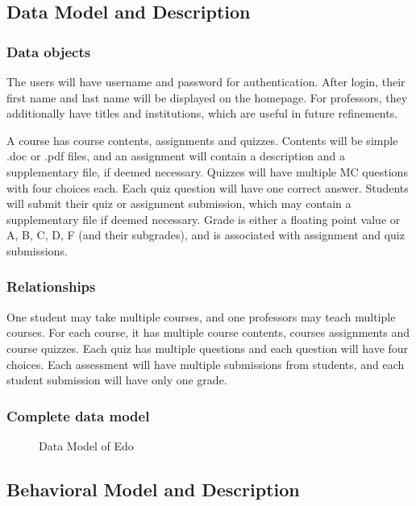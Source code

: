 \documentclass[paper=a4, fontsize=11pt]{scrartcl}
\numberwithin{equation}{section}		%
\numberwithin{figure}{section}			%
\numberwithin{table}{section}				%
\begin{document}
\subsection{Data Model and Description}

\subsubsection{Data objects}
The users will have username and password for authentication. After login, their first name and last name will be displayed on the homepage. For professors, they additionally have titles and institutions, which are useful in future refinements.

A course has course contents, assignments and quizzes. Contents will be simple .doc or .pdf files, and an assignment will contain a description and a supplementary file, if deemed necessary. Quizzes will have multiple MC questions with four choices each. Each quiz question will have one correct answer. Students will submit their quiz or assignment submission, which may contain a supplementary file if deemed necessary. Grade is either a floating point value or A, B, C, D, F (and their subgrades), and is associated with assignment and quiz submissions.

\subsubsection{Relationships}
One student may take multiple courses, and one professors may teach multiple courses. For each course, it has multiple course contents, courses assignments and course quizzes. Each quiz has multiple questions and each question will have four choices. Each assessment will have multiple submissions from students, and each student submission will have only one grade. 

\subsubsection{Complete data model}
\begin{figure}[!ht]
	\begin{center}
	\end{center}
	\caption{Data Model of Edo}
\end{figure}


\subsection{Behavioral Model and Description}
\end{document}
